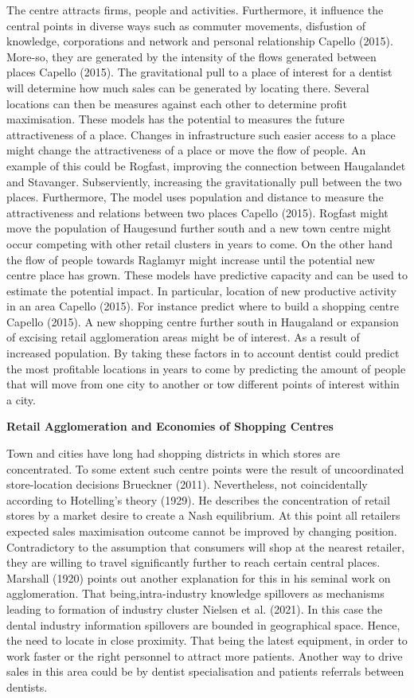 \documentclass[
  10,
  a4paper,
]{article}
\begin{document}
The centre attracts firms, people and activities. Furthermore, it
influence the central points in diverse ways such as commuter movements,
disfustion of knowledge, corporations and network and personal
relationship Capello (2015). More-so, they are generated by the
intensity of the flows generated between places Capello (2015). The
gravitational pull to a place of interest for a dentist will determine
how much sales can be generated by locating there. Several locations can
then be measures against each other to determine profit maximisation.
These models has the potential to measures the future attractiveness of
a place. Changes in infrastructure such easier access to a place might
change the attractiveness of a place or move the flow of people. An
example of this could be Rogfast, improving the connection between
Haugalandet and Stavanger. Subserviently, increasing the gravitationally
pull between the two places. Furthermore, The model uses population and
distance to measure the attractiveness and relations between two places
Capello (2015). Rogfast might move the population of Haugesund further
south and a new town centre might occur competing with other retail
clusters in years to come. On the other hand the flow of people towards
Raglamyr might increase until the potential new centre place has grown.
These models have predictive capacity and can be used to estimate the
potential impact. In particular, location of new productive activity in
an area Capello (2015). For instance predict where to build a shopping
centre Capello (2015). A new shopping centre further south in Haugaland
or expansion of excising retail agglomeration areas might be of
interest. As a result of increased population. By taking these factors
in to account dentist could predict the most profitable locations in
years to come by predicting the amount of people that will move from one
city to another or tow different points of interest within a city.

\textbf{Retail Agglomeration and Economies of Shopping Centres}

Town and cities have long had shopping districts in which stores are
concentrated. To some extent such centre points were the result of
uncoordinated store-location decisions Brueckner (2011). Nevertheless,
not coincidentally according to Hotelling's theory (1929). He describes
the concentration of retail stores by a market desire to create a Nash
equilibrium. At this point all retailers expected sales maximisation
outcome cannot be improved by changing position. Contradictory to the
assumption that consumers will shop at the nearest retailer, they are
willing to travel significantly further to reach certain central places.
Marshall (1920) points out another explanation for this in his seminal
work on agglomeration. That being,intra-industry knowledge spillovers as
mechanisms leading to formation of industry cluster Nielsen et al.
(2021). In this case the dental industry information spillovers are
bounded in geographical space. Hence, the need to locate in close
proximity. That being the latest equipment, in order to work faster or
the right personnel to attract more patients. Another way to drive sales
in this area could be by dentist specialisation and patients referrals
between dentists.
\end{document}
